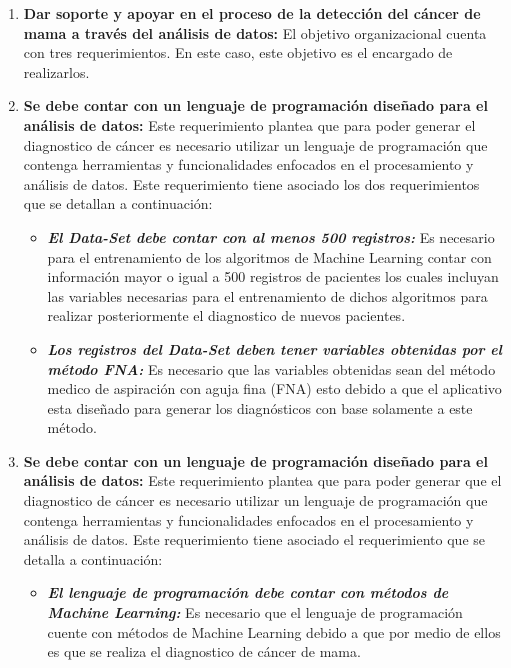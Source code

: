 \begin{enumerate}[label=\textbf{\arabic*})]
	\item  \textbf{Dar soporte y apoyar en el proceso de la detección del cáncer de mama a través del análisis de datos:} El	objetivo organizacional cuenta con tres requerimientos. En este caso,
	este objetivo es el encargado de realizarlos.
	
	\item  \textbf{Se debe contar con un lenguaje de programación diseñado para el análisis de datos:} Este requerimiento plantea que para poder generar el diagnostico de cáncer es necesario utilizar un lenguaje de programación que contenga herramientas y funcionalidades enfocados en el procesamiento y análisis de datos. Este requerimiento tiene asociado los dos requerimientos que se detallan a continuación:
	
	\begin{itemize}
		\item  \textbf{\textit{El Data-Set debe contar con al menos 500 registros:}} Es necesario para el entrenamiento de los algoritmos de Machine Learning contar con información mayor o igual a 500 registros de pacientes los cuales incluyan las variables necesarias para el entrenamiento de dichos algoritmos para realizar posteriormente el diagnostico de nuevos pacientes.   
		
		\item  \textbf{\textit{Los registros del Data-Set deben tener variables obtenidas por el método FNA:}} Es necesario que las variables obtenidas sean del método medico de  aspiración con aguja fina (FNA) esto debido a que el aplicativo esta diseñado para generar los diagnósticos con base solamente a este método.
	\end{itemize}
	
	\item  \textbf{Se debe contar con un lenguaje de programación diseñado para el análisis de datos:} Este requerimiento plantea que para poder generar que el diagnostico de cáncer es necesario utilizar un lenguaje de programación que contenga herramientas y funcionalidades enfocados en el procesamiento y análisis de datos. Este requerimiento tiene asociado el requerimiento que se detalla a continuación:
	
	\begin{itemize}
		\item  \textbf{\textit{El lenguaje de programación debe contar con métodos de Machine Learning:}} Es necesario que el lenguaje de programación cuente con métodos de Machine Learning debido a que por medio de ellos es que se realiza el diagnostico de cáncer de mama.
	\end{itemize}
	

\end{enumerate}
